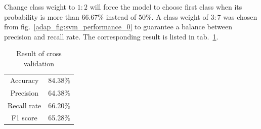 Change class weight to $1:2$ will force the model to choose first class when its probability is more than $66.67\%$ instead of $50\%$.
A class weight of $3:7$ was chosen from fig.~\ref{adap_fig:svm_performance_0} to guarantee a balance between precision and recall rate.
The corresponding result is listed in tab.~\ref{adap_tab:svm_result}.
\begin{table}[h!]
    \centering
    \caption{Result of cross validation}
    \begin{tabular}{cc}
        \toprule
        Accuracy    &   84.38\%    \\
        Precision   &   64.38\%     \\
        Recall rate &   66.20\%     \\
        F1 score    &   65.28\%     \\
        \bottomrule
    \end{tabular}
    \label{adap_tab:svm_result}
\end{table}
\pagebreak